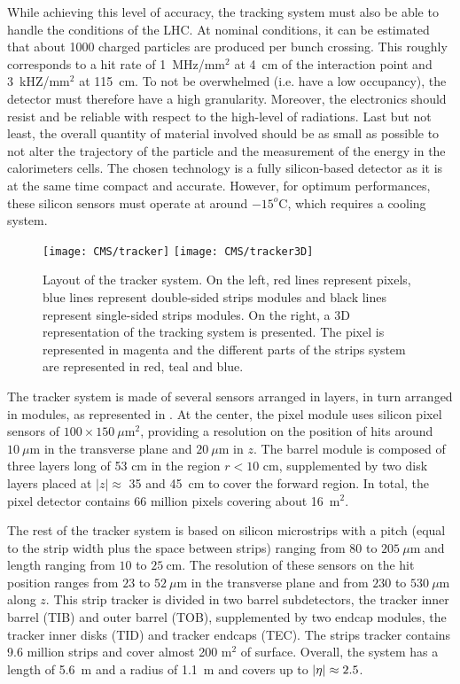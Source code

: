     While achieving this level of accuracy, the tracking system must also be able to handle the conditions of
    the LHC. At nominal conditions, it can be estimated that about 1000 charged particles
    are produced per bunch crossing. This roughly corresponds to a
    hit rate of 1~MHz/mm$^2$ at 4~cm of the interaction point and 3~kHZ/mm$^2$ at 115~cm.
    To not be overwhelmed (i.e. have a low occupancy), the detector must therefore
    have a high granularity. Moreover, the electronics should resist and be reliable
    with respect to the high-level of radiations. Last but not least, the overall
    quantity of material involved should be as small as possible to not alter the
    trajectory of the particle and the measurement of the energy in the calorimeters
    cells. The chosen technology is a fully silicon-based detector as it is at the
    same time compact and accurate. However, for optimum performances, these silicon
    sensors must operate at around $-15^o$C, which requires a cooling system.

    \begin{figure}[h!]
        \centering
        \texttt{[image: CMS/tracker]}
        \texttt{[image: CMS/tracker3D]}
        \caption{Layout of the tracker system.
        On the left, red lines represent pixels, blue lines represent double-sided
        strips modules and black lines represent single-sided strips modules. On the
        right, a 3D representation of the tracking system is presented. The pixel
        is represented in magenta and the different parts of the strips system are
        represented in red, teal and blue.}
        \label{fig:CMS/tracker}
    \end{figure}

    The tracker system is made of several sensors arranged in layers, in turn arranged
    in modules, as represented in . At the center, the pixel module
    uses silicon pixel sensors of $100 \times 150~\mu\text{m}^2$, providing a resolution
    on the position of hits around $10~\mu\text{m}$ in the transverse plane and
    $20~\mu\text{m}$ in $z$. The barrel module is composed of three layers long of 53 cm in the
    region $r < 10$ cm, supplemented by two disk layers placed at $\left|z\right| \approx$
    35 and 45~cm to cover the forward region. In total, the pixel detector contains 66
    million pixels covering about 16~m$^2$.

    The rest of the tracker system is based on silicon microstrips with a pitch (equal
    to the strip width plus the space between strips) ranging
    from $80$ to $205~\mu\text{m}$ and length ranging from $10$ to $25~\text{cm}$.
    The resolution of these sensors on the hit position ranges from $23$ to $52~\mu\text{m}$
    in the transverse plane and from $230$ to $530~\mu\text{m}$ along $z$.
    This strip tracker is divided in two barrel subdetectors, the tracker inner barrel
    (TIB) and outer barrel (TOB), supplemented by two endcap modules, the tracker inner
    disks (TID) and tracker endcaps (TEC). The strips tracker contains 9.6 million strips
    and cover almost 200 m$^2$ of surface. Overall, the system has a length of 5.6~m
    and a radius of 1.1~m and covers up to $\left| \eta \right| \approx 2.5$.

